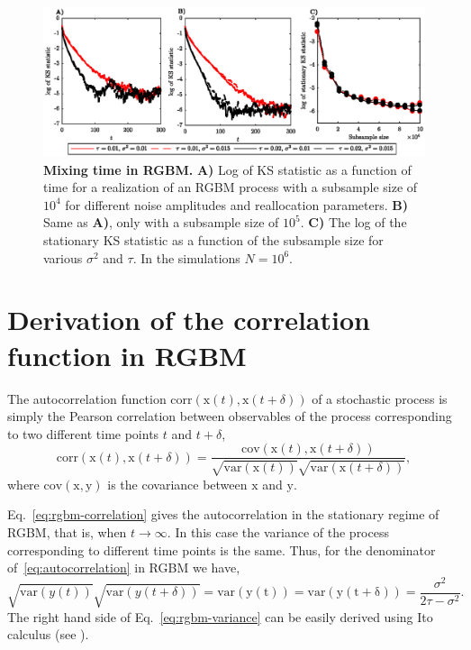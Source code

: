 \documentclass[11pt]{article}
\newcommand{\be}{\begin{equation}}
\newcommand{\ee}{\end{equation}}
\numberwithin{equation}{section}
\begin{document}
\begin{figure}[!htb]
\centering
\includegraphics[width=1.0\textwidth]{figs/fig_mixing_time_rgbm.eps}
\caption{\textbf{Mixing time in RGBM.} \textbf{A)} Log of KS statistic as a function of time for a realization of an RGBM process with a subsample size of $10^4$ for different noise amplitudes and reallocation parameters. \textbf{B)} Same as \textbf{A)}, only with a subsample size of $10^5$. \textbf{C)} The log of the stationary KS statistic as a function of the subsample size for various $\sigma^2$ and $\tau$. In the simulations $N = 10^6$. \label{fig:rgbm-mixing-time}}
\end{figure}

\section{Derivation of the correlation function in RGBM}\label{sec:rgbm-correlation-function}

The autocorrelation function $\mathrm{corr}(\mathrm{x}(t), \mathrm{x}(t+\delta))$ of a stochastic process is simply the Pearson correlation between observables of the process corresponding to two different time points $t$ and $t+\delta$, 
\be
    \mathrm{corr}(\mathrm{x}(t), \mathrm{x}(t+\delta)) = \frac{\mathrm{cov}(\mathrm{x}(t), \mathrm{x}(t+\delta))}{\sqrt{\mathrm{var}(\mathrm{x}(t))} \sqrt{\mathrm{var}(\mathrm{x}(t+\delta))}},
    \label{eq:autocorrelation}
\ee
where $\mathrm{cov}(\mathrm{x}, \mathrm{y})$ is the covariance between $\mathrm{x}$ and $\mathrm{y}$.

Eq.~\eqref{eq:rgbm-correlation} gives the autocorrelation in the stationary regime of RGBM, that is, when $t \to \infty$. In this case the variance of the process corresponding to different time points is the same. Thus, for the denominator of~\eqref{eq:autocorrelation} in RGBM we have,
\be
   \sqrt{\mathrm{var}(y(t))} \sqrt{\mathrm{var}(y(t+\delta))} = \mathrm{var(y(t))} = \mathrm{var(y(t+\delta))} = \frac{\sigma^2}{2\tau - \sigma^2}.
    \label{eq:rgbm-variance}
\ee
The right hand side of Eq.~\eqref{eq:rgbm-variance} can be easily derived using Ito calculus (see \citet{BermanPetersAdamou2019}).
\end{document}
